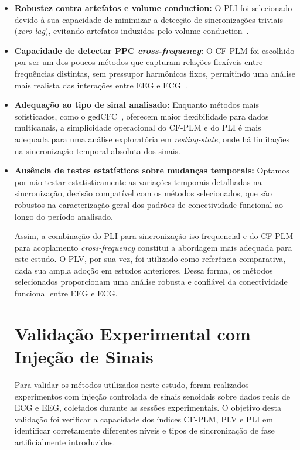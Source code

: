 \begin{itemize}
  \item \textbf{Robustez contra artefatos e volume conduction:} O PLI foi selecionado devido à sua capacidade de minimizar a detecção de sincronizações triviais (\textit{zero-lag}), evitando artefatos induzidos pelo volume conduction~\cite{seraj2018cerebral, zhang2014phase}.
  
  \item \textbf{Capacidade de detectar PPC \textit{cross-frequency}:} O CF-PLM foi escolhido por ser um dos poucos métodos que capturam relações flexíveis entre frequências distintas, sem pressupor harmônicos fixos, permitindo uma análise mais realista das interações entre EEG e ECG~\cite{sorrentino2022detection, seraj2018cerebral, chen2023multiple}.

  \item \textbf{Adequação ao tipo de sinal analisado:} Enquanto métodos mais sofisticados, como o gedCFC~\cite{cohen2017where}, oferecem maior flexibilidade para dados multicanais, a simplicidade operacional do CF-PLM e do PLI é mais adequada para uma análise exploratória em \textit{resting-state}, onde há limitações na sincronização temporal absoluta dos sinais.

  \item \textbf{Ausência de testes estatísticos sobre mudanças temporais:} Optamos por não testar estatisticamente as variações temporais detalhadas na sincronização, decisão compatível com os métodos selecionados, que são robustos na caracterização geral dos padrões de conectividade funcional ao longo do período analisado.

Assim, a combinação do PLI para sincronização iso-frequencial e do CF-PLM para acoplamento \textit{cross-frequency} constitui a abordagem mais adequada para este estudo. O PLV, por sua vez, foi utilizado como referência comparativa, dada sua ampla adoção em estudos anteriores. Dessa forma, os métodos selecionados proporcionam uma análise robusta e confiável da conectividade funcional entre EEG e ECG.


\section{Validação Experimental com Injeção de Sinais}
Para validar os métodos utilizados neste estudo, foram realizados experimentos com injeção controlada de sinais senoidais sobre dados reais de ECG e EEG, coletados durante as sessões experimentais. O objetivo desta validação foi verificar a capacidade dos índices CF-PLM, PLV e PLI em identificar corretamente diferentes níveis e tipos de sincronização de fase artificialmente introduzidos.


\end{itemize}
